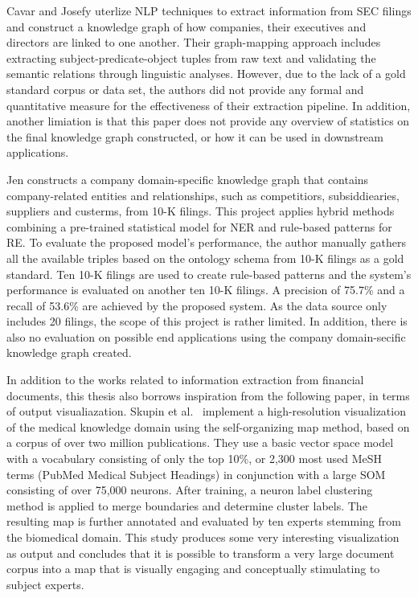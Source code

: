 Cavar and Josefy \cite{MappingKG2018} uterlize NLP techniques to extract information from SEC filings and construct a knowledge graph of how companies, their executives and directors are linked to one another. Their graph-mapping approach includes extracting subject-predicate-object tuples from raw text and validating the semantic relations through linguistic analyses. However, due to the lack of a gold standard corpus or data set, the authors did not provide any formal and quantitative measure for the effectiveness of their extraction pipeline. In addition, another limiation is that this paper does not provide any overview of statistics on the final knowledge graph constructed, or how it can be used in downstream applications. 

Jen \cite{CompanyKG2021} constructs a company domain-specific knowledge graph that contains company-related entities and relationships, such as competitiors, subsiddiearies, suppliers and custerms, from 10-K filings. This project applies hybrid methods combining a pre-trained statistical model for NER and rule-based patterns for RE. To evaluate the proposed model's performance, the author manually gathers all the available triples based on the ontology schema from 10-K filings as a gold standard. Ten 10-K filings are used to create rule-based patterns and the system's performance is evaluated on another ten 10-K filings. A precision of  75.7\% and a recall of 53.6\% are achieved by the proposed system. As the data source only includes 20 filings, the scope of this project is rather limited. In addition, there is also no evaluation on possible end applications using the company domain-secific knowledge graph created. 

In addition to the works related to information extraction from financial documents, this thesis also borrows inspiration from the following paper, in terms of output visualiazation. Skupin et al.~\cite{SOM2013} implement a high-resolution visualization of the medical knowledge domain using the self-organizing map method, based on a corpus of over two million publications. They use a basic vector space model with a vocabulary consisting of only the top 10\%, or 2,300 most used MeSH terms (PubMed Medical Subject Headings) in conjunction with a large SOM consisting of over 75,000 neurons. After training, a neuron label clustering method is applied to merge boundaries and determine cluster labels. The resulting map is further annotated and evaluated by ten experts stemming from the biomedical domain. This study produces some very interesting visualization as output and concludes that it is possible to transform a very large document corpus into a map that is visually engaging and conceptually stimulating to subject experts.







